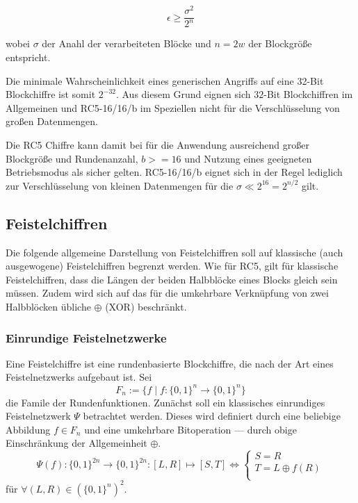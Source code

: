 \documentclass[course=erap]{aspdoc}
\begin{document}
\[
    \epsilon \geq \frac{\sigma^2}{2^n}
\]

wobei $\sigma$ der Anahl der verarbeiteten Blöcke und $n = 2w$ der Blockgröße entspricht.\cite[p.24]{bellare}\bigbreak

Die minimale Wahrscheinlichkeit eines generischen Angriffs auf eine 32-Bit Blockchiffre ist somit $2^{-32}$. Aus diesem Grund eignen sich $32$-Bit Blockchiffren im Allgemeinen und RC5-16/16/b im Speziellen nicht für die Verschlüsselung von großen Datenmengen.\bigbreak

Die RC5 Chiffre kann damit bei für die Anwendung ausreichend großer Blockgröße und Rundenanzahl, $b >= 16$ und Nutzung eines geeigneten Betriebsmodus als sicher gelten. RC5-16/16/b eignet sich in der Regel lediglich zur Verschlüsselung von kleinen Datenmengen für die $\sigma \ll 2^{16} = 2^{n/2}$ gilt.

\subsection{Feistelchiffren}

Die folgende allgemeine Darstellung von Feistelchiffren soll auf klassische (auch ausgewogene) Feistelchiffren begrenzt werden. Wie für RC5, gilt für klassische Feistelchiffren, dass die Längen der beiden Halbblöcke eines Blocks gleich sein müssen. Zudem wird sich auf das für die umkehrbare Verknüpfung von zwei Halbblöcken übliche $\oplus$ (XOR) beschränkt.

\subsubsection{Einrundige Feistelnetzwerke}

Eine Feistelchiffre ist eine rundenbasierte Blockchiffre, die nach der Art eines Feistelnetzwerks aufgebaut ist. Sei
\[
    F_n := \{f \mid f \colon \{0, 1\}^n \to \{0, 1\}^n\}
\]
die Famile der Rundenfunktionen. Zunächst soll ein klassisches einrundiges Feistelnetzwerk $\Psi$ betrachtet werden. Dieses wird definiert durch eine beliebige Abbildung $f \in F_n$ und eine umkehrbare Bitoperation --- durch obige Einschränkung der Allgemeinheit $\oplus$.
\[
    \Psi(f) \colon \{0, 1\}^{2n} \to \{0, 1\}^{2n} \colon [L, R] \mapsto [S, T] \Leftrightarrow
        \begin{cases}
            S = R \\
            T = L \oplus f(R) \\
        \end{cases}
\]
für $\forall(L, R) \in (\{0, 1\}^n)^2$.\cite[p.11]{nachef}
\end{document}
